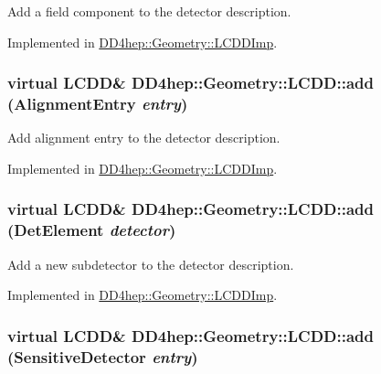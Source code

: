 Add a field component to the detector description. 

Implemented in \hyperlink{class_d_d4hep_1_1_geometry_1_1_l_c_d_d_imp_aefc75f3c9c031176d3d3e5eafe091716}{DD4hep::Geometry::LCDDImp}.\hypertarget{class_d_d4hep_1_1_geometry_1_1_l_c_d_d_a338b46c3a01bcd48b9c9f8ad74501c1d}{
\subsubsection[{add}]{\setlength{\rightskip}{0pt plus 5cm}virtual {\bf LCDD}\& DD4hep::Geometry::LCDD::add ({\bf AlignmentEntry} {\em entry})}}
\label{class_d_d4hep_1_1_geometry_1_1_l_c_d_d_a338b46c3a01bcd48b9c9f8ad74501c1d}


Add alignment entry to the detector description. 

Implemented in \hyperlink{class_d_d4hep_1_1_geometry_1_1_l_c_d_d_imp_a8322896ad0d803ecb38fd3ccd3cdb989}{DD4hep::Geometry::LCDDImp}.\hypertarget{class_d_d4hep_1_1_geometry_1_1_l_c_d_d_a9b756dac3f0ebc5393072f23c96cb490}{
\subsubsection[{add}]{\setlength{\rightskip}{0pt plus 5cm}virtual {\bf LCDD}\& DD4hep::Geometry::LCDD::add ({\bf DetElement} {\em detector})}}
\label{class_d_d4hep_1_1_geometry_1_1_l_c_d_d_a9b756dac3f0ebc5393072f23c96cb490}


Add a new subdetector to the detector description. 

Implemented in \hyperlink{class_d_d4hep_1_1_geometry_1_1_l_c_d_d_imp_a06e5ca9521c2527da58eded16edce69e}{DD4hep::Geometry::LCDDImp}.\hypertarget{class_d_d4hep_1_1_geometry_1_1_l_c_d_d_a6c10312be5b4fdf8132e25eae6abdac0}{
\subsubsection[{add}]{\setlength{\rightskip}{0pt plus 5cm}virtual {\bf LCDD}\& DD4hep::Geometry::LCDD::add ({\bf SensitiveDetector} {\em entry})}}
\label{class_d_d4hep_1_1_geometry_1_1_l_c_d_d_a6c10312be5b4fdf8132e25eae6abdac0}


